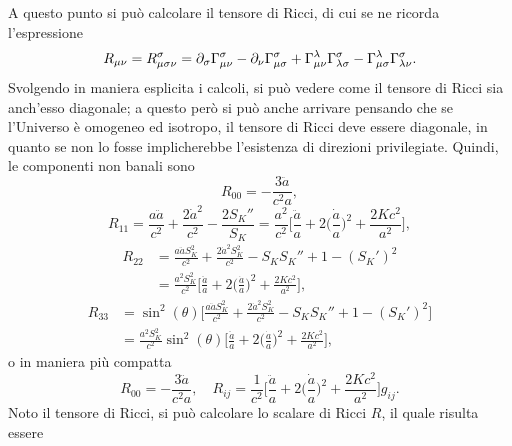 A questo punto si può calcolare il tensore di Ricci, di cui se ne ricorda l'espressione
\begin{equation}
    R_{\mu\nu} = R^\sigma_{\mu\sigma\nu} = \partial_\sigma \Gamma^\sigma_{\mu\nu} - \partial_\nu\Gamma^\sigma_{\mu\sigma} + \Gamma^\lambda_{\mu\nu}\Gamma^\sigma_{\lambda\sigma} - \Gamma^\lambda_{\mu\sigma}\Gamma^\sigma_{\lambda\nu}.
\end{equation}
Svolgendo in maniera esplicita i calcoli, si può vedere come il tensore di Ricci sia anch'esso diagonale; a questo però si può anche arrivare pensando che se l'Universo è omogeneo ed isotropo, il tensore di Ricci deve essere diagonale, in quanto se non lo fosse implicherebbe l'esistenza di direzioni privilegiate. Quindi, le componenti non banali sono 
\begin{equation}
    R_{00} = -\frac{3\ddot{a}}{c^2a},
\end{equation}
\begin{equation}
    R_{11} = \frac{a\ddot{a}}{c^2} + \frac{2\dot{a}^2}{c^2} - \frac{2S_K''}{S_K} = \frac{a^2}{c^2}\bigg[\frac{\ddot{a}}{a} + 2\bigg(\frac{\dot{a}}{a}\bigg)^2 + \frac{2Kc^2}{a^2}\bigg],
\end{equation}
\begin{equation}
    \begin{split}
        R_{22} &= \frac{a\ddot{a}S_K^2}{c^2} + \frac{2\dot{a}^2S_K^2}{c^2} - S_KS_K'' + 1 - (S_K')^2  \\
        &= \frac{a^2S_K^2}{c^2}\bigg[\frac{\ddot{a}}{a} + 2\bigg(\frac{\dot{a}}{a}\bigg)^2 + \frac{2Kc^2}{a^2}\bigg],
    \end{split}
\end{equation}
\begin{equation}
    \begin{split}
        R_{33} &= \sin^2{(\theta)}\bigg[\frac{a\ddot{a}S_K^2}{c^2} + \frac{2\dot{a}^2S_K^2}{c^2} - S_KS_K'' + 1 - (S_K')^2\bigg] \\
        &= \frac{a^2S_K^2}{c^2}\sin^2{(\theta)}\bigg[\frac{\ddot{a}}{a} + 2\bigg(\frac{\dot{a}}{a}\bigg)^2 + \frac{2Kc^2}{a^2}\bigg],
    \end{split}
\end{equation}
o in maniera più compatta 
\begin{equation}
    R_{00} = -\frac{3\ddot{a}}{c^2a},\quad R_{ij} = \frac{1}{c^2}\bigg[\frac{\ddot{a}}{a} + 2\bigg(\frac{\dot{a}}{a}\bigg)^2 + \frac{2Kc^2}{a^2}\bigg]g_{ij}.
\end{equation}
Noto il tensore di Ricci, si può calcolare lo scalare di Ricci $R$, il quale risulta essere
